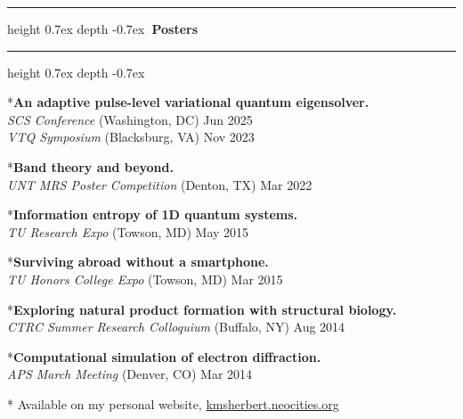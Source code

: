 \documentclass[marginmode, 10pt]{res} %
\def\Vhrulefill{\leavevmode\leaders\hrule height 0.7ex depth \dimexpr0.4pt-0.7ex\hfill\kern0pt}         %
\begin{document}
\begin{resume}
\Vhrulefill \textbf{~Posters~} \Vhrulefill

*\textbf{An adaptive pulse-level variational quantum eigensolver.} \\
    \textit{SCS Conference} (Washington, DC) \hfill Jun 2025 \\
    \textit{VTQ Symposium} (Blacksburg, VA) \hfill Nov 2023

*\textbf{Band theory and beyond.} \\
    \textit{UNT MRS Poster Competition} (Denton, TX) \hfill Mar 2022

*\textbf{Information entropy of 1D quantum systems.} \\
    \textit{TU Research Expo} (Towson, MD) \hfill May 2015

*\textbf{Surviving abroad without a smartphone.} \\
    \textit{TU Honors College Expo} (Towson, MD) \hfill Mar 2015

*\textbf{Exploring natural product formation with structural biology.} \\
    \textit{CTRC Summer Research Colloquium} (Buffalo, NY) \hfill Aug 2014

*\textbf{Computational simulation of electron diffraction.} \\
    \textit{APS March Meeting} (Denver, CO) \hfill Mar 2014

* Available on my personal website, \href{kmsherbert.neocities.org}{kmsherbert.neocities.org}


\end{resume}
\end{document}
